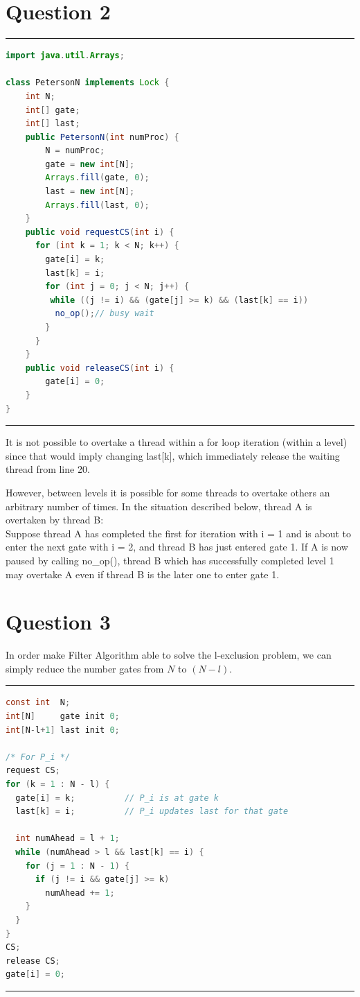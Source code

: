 \documentclass[12pt]{article}
\begin{document}
\section*{Question 2}
\noindent\rule[0.5ex]{\linewidth}{1pt}
\begin{lstlisting}[language=Java] 
import java.util.Arrays;

class PetersonN implements Lock {
    int N;
    int[] gate; 
    int[] last; 
    public PetersonN(int numProc) {
        N = numProc;
        gate = new int[N];
        Arrays.fill(gate, 0);
        last = new int[N];
        Arrays.fill(last, 0);
    }
    public void requestCS(int i) {
      for (int k = 1; k < N; k++) { 
        gate[i] = k; 
        last[k] = i;
        for (int j = 0; j < N; j++) {
         while ((j != i) && (gate[j] >= k) && (last[k] == i)) 
          no_op();// busy wait
        }
      }
    }
    public void releaseCS(int i) {
        gate[i] = 0;
    }
}
\end{lstlisting}
\noindent\rule[0.5ex]{\linewidth}{1pt}
It is not possible to overtake a thread within a for loop iteration (within a level) since that would imply changing last[k], which immediately release the waiting thread from line 20.  

However, between levels it is possible for some threads to overtake others an arbitrary number of times. In the situation described below, thread A is overtaken by thread B: \\
Suppose thread A has completed the first for iteration with i = 1 and is about to enter the next gate with i = 2, and thread B has just entered gate 1. If A is now paused by calling no\_op(), thread B which has successfully completed level 1 may overtake A even if thread B is the later one to enter gate 1. 

\section*{Question 3} 
In order make Filter Algorithm able to solve the l-exclusion problem, we can simply reduce the number gates from $N$ to $(N - l)$. \\
\noindent\rule[0.5ex]{\linewidth}{1pt}
\begin{lstlisting}[language=C] 
const int  N;           
int[N]     gate init 0; 
int[N-l+1] last init 0; 

/* For P_i */ 
request CS; 
for (k = 1 : N - l) { 
  gate[i] = k;          // P_i is at gate k 
  last[k] = i;          // P_i updates last for that gate 
	
  int numAhead = l + 1;   
  while (numAhead > l && last[k] == i) {
    for (j = 1 : N - 1) {
	  if (j != i && gate[j] >= k) 
	    numAhead += 1; 
    }
  }
}
CS; 
release CS; 
gate[i] = 0; 
\end{lstlisting}
\noindent\rule[0.5ex]{\linewidth}{1pt}
\end{document}
